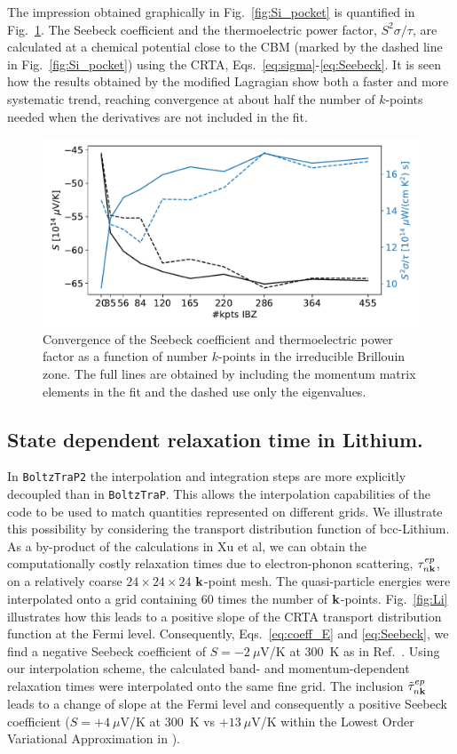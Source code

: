 \documentclass[final,5p,times,twocolumn,sort&compress]{elsarticle}
\begin{document}
The impression obtained graphically in Fig.~\ref{fig:Si_pocket} is quantified in Fig.~\ref{fig:Si_conv}. The Seebeck coefficient and the thermoelectric power factor, $S^2\sigma/\tau$, are calculated at a chemical potential close to the CBM (marked by the dashed line in Fig.~\ref{fig:Si_pocket}) using the CRTA, Eqs.~\eqref{eq:sigma}-\eqref{eq:Seebeck}. It is seen how the results obtained by the modified Lagragian show both a faster and more systematic trend, reaching convergence at about half the number of $k$-points needed when the derivatives are not included in the fit.
\begin{figure}[htb]
\begin{center}
\includegraphics[width=.9\columnwidth]{Si_conv}
\end{center}
\caption{Convergence of the Seebeck coefficient and thermoelectric power factor as a function of number $k$-points in the irreducible Brillouin zone. The full lines are obtained by including the momentum matrix elements in the fit and the dashed use only the eigenvalues.}
\label{fig:Si_conv}
\end{figure}

\subsection{State dependent relaxation time in Lithium.}
In \texttt{BoltzTraP2} the interpolation and integration steps are more explicitly decoupled than in \texttt{BoltzTraP}. This allows the interpolation capabilities of the code to be used to match quantities represented on different grids. We illustrate this possibility by considering the transport distribution function of bcc-Lithium. As a by-product of the calculations in Xu et al\cite{Xu_PRL14}, we can obtain the computationally costly relaxation times due to electron-phonon scattering, $\tau^{ep}_{n{\bf k}}$, on a relatively coarse $24\times24\times24$ ${\bf k}$-point mesh. The quasi-particle energies were interpolated onto a grid containing 60 times the number of ${\bf k}$-points. Fig.~\ref{fig:Li} illustrates how this leads to a positive slope of the CRTA transport distribution function at the Fermi level. Consequently, Eqs.~\eqref{eq:coeff_E} and \eqref{eq:Seebeck}, we find a negative Seebeck coefficient of $S=-2\ \mu$V/K at 300~K as in Ref.~\cite{Xu_PRL14}. Using our interpolation scheme, the calculated band- and momentum-dependent relaxation times were interpolated onto the same fine grid. The inclusion $\tilde{\tau}^{ep}_{n{\bf k}}$ leads to a change of slope at the Fermi level and consequently a positive Seebeck coefficient ($S=+4\ \mu$V/K at 300~K vs $+13\ \mu$V/K within the Lowest Order Variational Approximation in \cite{Xu_PRL14}).
 
\end{document}
